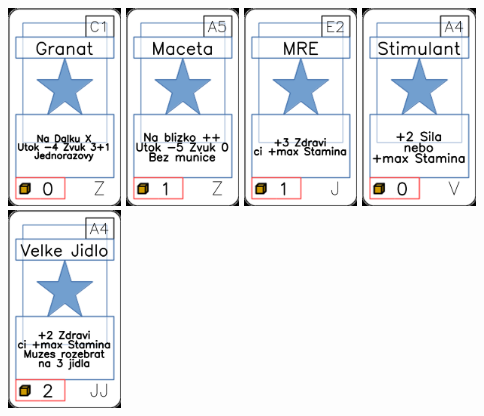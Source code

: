 \documentclass[a4paper]{article}
\begin{document}
	\includegraphics[width=3.0cm]{img-1_100}
	\includegraphics[width=3.0cm]{img-1_94}
	\includegraphics[width=3.0cm]{img-1_21}
	\includegraphics[width=3.0cm]{img-1_63}
	\includegraphics[width=3.0cm]{img-1_33}
\end{document}
